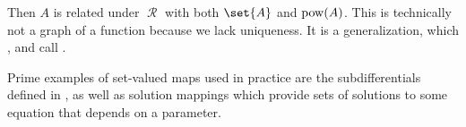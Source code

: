 \begin{remark}
  Then \( A \) is related under \( \mscrR \) with both \( \set{ A } \) and \( \operatorname{pow}(A) \). This is technically not a graph of a function because we lack uniqueness. It is a generalization, which ,  and  call .

  Prime examples of set-valued maps used in practice are the subdifferentials defined in , as well as solution mappings which provide sets of solutions to some equation that depends on a parameter.
\end{remark}

